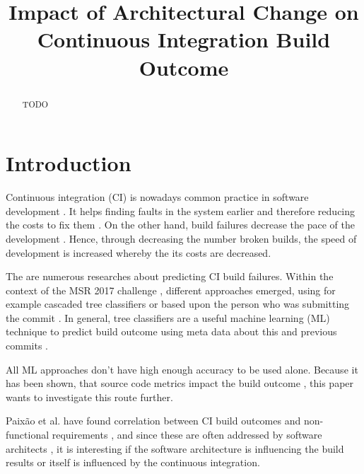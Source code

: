 \documentclass[conference]{IEEEtran}
\begin{document}
\title{Impact of Architectural Change on
	Continuous Integration Build Outcome\\
}

\author{
}

\maketitle

\begin{abstract}
TODO
\end{abstract}

\section{Introduction}

Continuous integration (CI) is nowadays common practice in software development \cite{CI-Common}. It helps finding faults in the system earlier and therefore reducing the costs to fix them \cite{NutzenCI}. On the other hand, build failures decrease the pace of the development \cite{Costs-BuildFailures}. Hence, through decreasing the number broken builds, the speed of development is increased whereby the its costs are decreased.

The are numerous researches about predicting CI build failures. Within the context of the MSR 2017 challenge \cite{TravisTorrent},  different approaches emerged, using for example cascaded tree classifiers \cite{Pred-Cascade} or based upon the person who was submitting the commit \cite{ContrInvolv}. In general, tree classifiers are a useful machine learning (ML) technique to predict build outcome using meta data about this and previous commits \cite{Pred-Tree, ML-Project}. 

All ML approaches don't have high enough accuracy to be used alone. Because it has been shown, that source code metrics impact the build outcome \cite{FailsCorr}, this paper wants to investigate this route further. 

Paixão et al. have found correlation between CI build outcomes and non-functional requirements \cite{Fail-NFReq}, and since these are often addressed by software architects \cite{NFR-Architects}, it is interesting if the software architecture is influencing the build results or itself is influenced by the continuous integration. 
\end{document}
